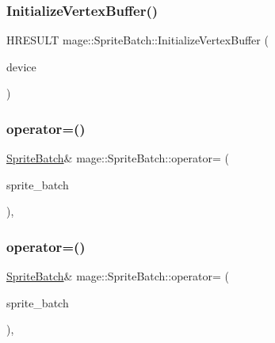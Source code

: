 \hypertarget{classmage_1_1_sprite_batch_aeb80ebc6472c1244878d6bb49cdfac22}{}\label{classmage_1_1_sprite_batch_aeb80ebc6472c1244878d6bb49cdfac22} 
\subsubsection{\texorpdfstring{Initialize\+Vertex\+Buffer()}{InitializeVertexBuffer()}}
{\footnotesize\ttfamily H\+R\+E\+S\+U\+LT mage\+::\+Sprite\+Batch\+::\+Initialize\+Vertex\+Buffer (\begin{DoxyParamCaption}\item[{I\+D3\+D11\+Device2 \&}]{device }\end{DoxyParamCaption})\hspace{0.3cm}{\ttfamily [private]}}

\hypertarget{classmage_1_1_sprite_batch_aa2a5df588d7589a36b38b35dc8a08a48}{}\label{classmage_1_1_sprite_batch_aa2a5df588d7589a36b38b35dc8a08a48} 
\subsubsection{\texorpdfstring{operator=()}{operator=()}\hspace{0.1cm}{\footnotesize\ttfamily [1/2]}}
{\footnotesize\ttfamily \hyperlink{classmage_1_1_sprite_batch}{Sprite\+Batch}\& mage\+::\+Sprite\+Batch\+::operator= (\begin{DoxyParamCaption}\item[{const \hyperlink{classmage_1_1_sprite_batch}{Sprite\+Batch} \&}]{sprite\+\_\+batch }\end{DoxyParamCaption})\hspace{0.3cm}{\ttfamily [private]}, {\ttfamily [delete]}}

\hypertarget{classmage_1_1_sprite_batch_ad46c172200bf47c10fa13fb3a70a4104}{}\label{classmage_1_1_sprite_batch_ad46c172200bf47c10fa13fb3a70a4104} 
\subsubsection{\texorpdfstring{operator=()}{operator=()}\hspace{0.1cm}{\footnotesize\ttfamily [2/2]}}
{\footnotesize\ttfamily \hyperlink{classmage_1_1_sprite_batch}{Sprite\+Batch}\& mage\+::\+Sprite\+Batch\+::operator= (\begin{DoxyParamCaption}\item[{\hyperlink{classmage_1_1_sprite_batch}{Sprite\+Batch} \&\&}]{sprite\+\_\+batch }\end{DoxyParamCaption})\hspace{0.3cm}{\ttfamily [private]}, {\ttfamily [delete]}}

